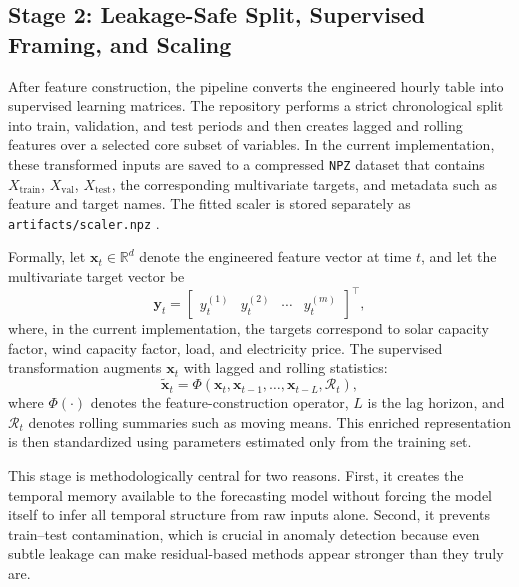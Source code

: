 \subsection{Stage 2: Leakage-Safe Split, Supervised Framing, and Scaling}

After feature construction, the pipeline converts the engineered hourly table into supervised learning matrices. The repository performs a strict chronological split into train, validation, and test periods and then creates lagged and rolling features over a selected core subset of variables. In the current implementation, these transformed inputs are saved to a compressed \texttt{NPZ} dataset that contains $X_{\text{train}}$, $X_{\text{val}}$, $X_{\text{test}}$, the corresponding multivariate targets, and metadata such as feature and target names. The fitted scaler is stored separately as \texttt{artifacts/scaler.npz} \cite{repo_thesis_grid_anomaly}.

Formally, let $\mathbf{x}_t \in \mathbb{R}^{d}$ denote the engineered feature vector at time $t$, and let the multivariate target vector be
\begin{equation}
	\mathbf{y}_t =
	\begin{bmatrix}
		y_t^{(1)} & y_t^{(2)} & \cdots & y_t^{(m)}
	\end{bmatrix}^{\top},
	\label{eq:framework_targets}
\end{equation}
where, in the current implementation, the targets correspond to solar capacity factor, wind capacity factor, load, and electricity price. The supervised transformation augments $\mathbf{x}_t$ with lagged and rolling statistics:
\begin{equation}
	\tilde{\mathbf{x}}_t = \Phi\!\left(\mathbf{x}_t, \mathbf{x}_{t-1}, \dots, \mathbf{x}_{t-L}, \mathcal{R}_t\right),
	\label{eq:framework_supervised}
\end{equation}
where $\Phi(\cdot)$ denotes the feature-construction operator, $L$ is the lag horizon, and $\mathcal{R}_t$ denotes rolling summaries such as moving means. This enriched representation is then standardized using parameters estimated only from the training set.

This stage is methodologically central for two reasons. First, it creates the temporal memory available to the forecasting model without forcing the model itself to infer all temporal structure from raw inputs alone. Second, it prevents train--test contamination, which is crucial in anomaly detection because even subtle leakage can make residual-based methods appear stronger than they truly are.

